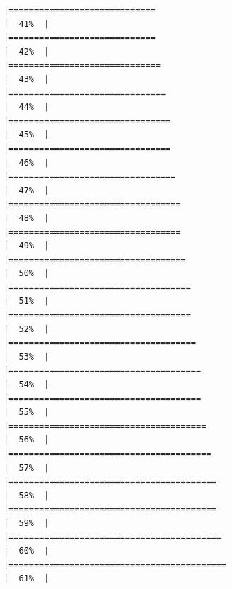 \documentclass[
]{article}
\begin{document}
\begin{verbatim}
|=============================                                         |  41%  |                                                                              |=============================                                         |  42%  |                                                                              |==============================                                        |  43%  |                                                                              |===============================                                       |  44%  |                                                                              |================================                                      |  45%  |                                                                              |================================                                      |  46%  |                                                                              |=================================                                     |  47%  |                                                                              |==================================                                    |  48%  |                                                                              |==================================                                    |  49%  |                                                                              |===================================                                   |  50%  |                                                                              |====================================                                  |  51%  |                                                                              |====================================                                  |  52%  |                                                                              |=====================================                                 |  53%  |                                                                              |======================================                                |  54%  |                                                                              |======================================                                |  55%  |                                                                              |=======================================                               |  56%  |                                                                              |========================================                              |  57%  |                                                                              |=========================================                             |  58%  |                                                                              |=========================================                             |  59%  |                                                                              |==========================================                            |  60%  |                                                                              |===========================================                           |  61%  |                                                                              
\end{verbatim}
\end{document}
